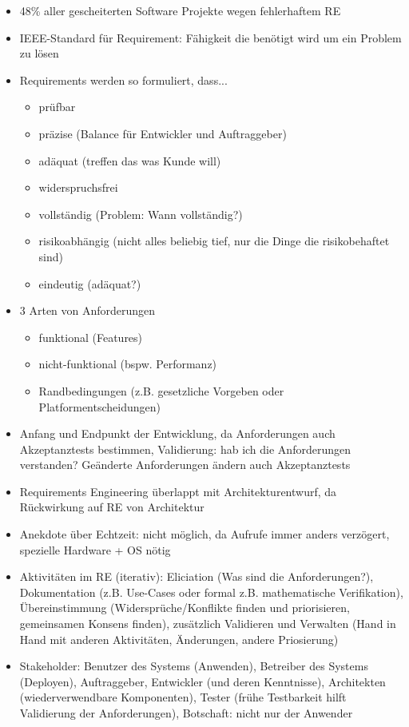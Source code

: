 \documentclass[paper=a4, fontsize=11pt]{scrartcl} %
\numberwithin{equation}{section} %
\numberwithin{figure}{section} %
\numberwithin{table}{section} %
\begin{document}
\begin{itemize}
  \item 48\% aller gescheiterten Software Projekte wegen fehlerhaftem RE
  \item IEEE-Standard für Requirement: Fähigkeit die benötigt wird um ein Problem zu lösen
  \item Requirements werden so formuliert, dass...
  \begin{itemize}
    \item prüfbar
    \item präzise (Balance für Entwickler und Auftraggeber)
    \item adäquat (treffen das was Kunde will)
    \item widerspruchsfrei
    \item vollständig (Problem: Wann vollständig?)
    \item risikoabhängig (nicht alles beliebig tief, nur die Dinge die risikobehaftet sind)
    \item eindeutig (adäquat?)
  \end{itemize}
  \item 3 Arten von Anforderungen
  \begin{itemize}
    \item funktional (Features)
    \item nicht-funktional (bspw. Performanz)
    \item Randbedingungen (z.B. gesetzliche Vorgeben oder Platformentscheidungen)
  \end{itemize}
  \item Anfang und Endpunkt der Entwicklung, da Anforderungen auch Akzeptanztests bestimmen, Validierung: hab ich die Anforderungen verstanden? Geänderte Anforderungen ändern auch Akzeptanztests
  \item Requirements Engineering überlappt mit Architekturentwurf, da Rückwirkung auf RE von Architektur
  \item Anekdote über Echtzeit: nicht möglich, da Aufrufe immer anders verzögert, spezielle Hardware + OS nötig
  \item Aktivitäten im RE (iterativ): Eliciation (Was sind die Anforderungen?), Dokumentation (z.B. Use-Cases oder formal z.B. mathematische Verifikation), Übereinstimmung (Widersprüche/Konflikte finden und priorisieren, gemeinsamen Konsens finden), zusätzlich Validieren und Verwalten (Hand in Hand mit anderen Aktivitäten, Änderungen, andere Priosierung)
  \item Stakeholder: Benutzer des Systems (Anwenden), Betreiber des Systems (Deployen), Auftraggeber, Entwickler (und deren Kenntnisse), Architekten (wiederverwendbare Komponenten), Tester (frühe Testbarkeit hilft Validierung der Anforderungen), Botschaft: nicht nur der Anwender

\end{itemize}
\end{document}
